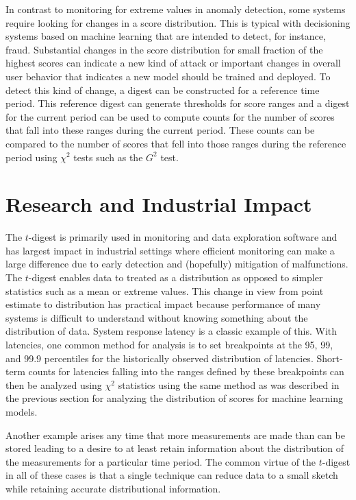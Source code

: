 \documentclass[preprint,12pt, a4paper]{elsarticle}
\begin{document}
In contrast to monitoring for extreme values in anomaly detection, some systems require looking for changes in a score distribution\cite{machine-learning-logistics}. This is typical with decisioning systems based on machine learning that are intended to detect, for instance, fraud. Substantial changes in the score distribution for small fraction of the highest scores can indicate a new kind of attack or important changes in overall user behavior that indicates a new model should be trained and deployed. To detect this kind of change, a digest can be constructed for a reference time period. This reference digest can generate thresholds for score ranges and a digest for the current period can be used to compute counts for the number of scores that fall into these ranges during the current period. These counts can be compared to the number of scores that fell into those ranges during the reference period using $\chi^2$ tests such as the $G^2$ test\cite{dunning93}.


\section{Research and Industrial Impact}
The $t$-digest is primarily used in monitoring and data exploration software and has largest impact in industrial settings where efficient monitoring can make a large difference due to early detection and (hopefully) mitigation of malfunctions. The $t$-digest enables data to treated as a distribution as opposed to simpler statistics such as a mean or extreme values. This change in view from point estimate to distribution has practical impact because performance of many systems is difficult to understand without knowing something about the distribution of data. System response latency is a classic example of this\cite{tene}. With latencies, one common method for analysis is to set breakpoints at the 95, 99, and 99.9 percentiles for the historically observed distribution of latencies. Short-term counts for latencies falling into the ranges defined by these breakpoints can then be analyzed using $\chi^2$ statistics using the same method as was described in the previous section for analyzing the distribution of scores for machine learning models.

Another example arises any time that more measurements are made than can be stored leading to a desire to at least retain information about the distribution of the measurements for a particular time period. The common virtue of the $t$-digest in all of these cases is that a single technique can reduce data to a small sketch while retaining accurate distributional information.
\end{document}
